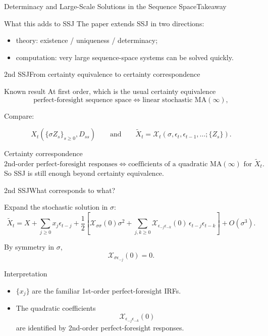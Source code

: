\documentclass[aspectratio=169]{beamer}
\begin{document}
\begin{frame}{Determinacy and Large-Scale Solutions in the Sequence Space}{Takeaway \cite{auclert2025determinacy}}
\small
\begin{alertblock}{What this adds to SSJ}
The paper extends SSJ in two directions:
\begin{itemize}
    \item \alert{theory}: existence / uniqueness / determinacy;
    \item \alert{computation}: very large sequence-space systems can be solved quickly.
\end{itemize}
\end{alertblock}
\end{frame}

\begin{frame}{2nd SSJ}{From certainty equivalence to certainty correspondence}
\small

\begin{block}{Known result}
At first order, which is the usual certainty equivalence
\[
\text{perfect-foresight sequence space}
\Longleftrightarrow
\text{linear stochastic MA}(\infty),
\]
\end{block}

Compare:

\[
X_t\!\left(\{\sigma Z_s\}_{s\ge0},D_{ss}\right)
\qquad\text{and}\qquad
\widetilde X_t=\mathcal X_t(\sigma,\epsilon_t,\epsilon_{t-1},\ldots;\{Z_s\}).
\]

\begin{alertblock}{Certainty correspondence}
\[
\text{2nd-order perfect-foresight responses}
\Longleftrightarrow
\text{coefficients of a quadratic MA}(\infty)\text{ for }\widetilde X_t.
\]
So SSJ is still enough beyond certainty equivalence.
\end{alertblock}

\end{frame}

\begin{frame}{2nd SSJ}{What corresponds to what?}
\small

Expand the stochastic solution in $\sigma$:
\[
\widetilde X_t
=
X
+\sum_{j\ge0} x_j \epsilon_{t-j}
+\frac12\!\left[
\mathcal X_{\sigma\sigma}(0)\sigma^2
+
\sum_{j,k\ge0}\mathcal X_{\epsilon_{-j}\epsilon_{-k}}(0)\,
\epsilon_{t-j}\epsilon_{t-k}
\right]
+O(\sigma^3).
\]

By symmetry in $\sigma$,
\[
\mathcal X_{\sigma\epsilon_{-j}}(0)=0.
\]

\begin{block}{Interpretation}
\begin{itemize}
    \item $\{x_j\}$ are the familiar \alert{1st-order perfect-foresight IRFs}.
    \item The quadratic coefficients
    \[
    \mathcal X_{\epsilon_{-j}\epsilon_{-k}}(0)
    \]
    are identified by \alert{2nd-order perfect-foresight responses}.
\end{itemize}
\end{block}

\end{frame}
\end{document}
